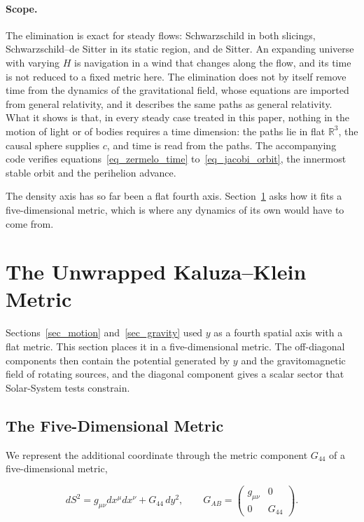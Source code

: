 \documentclass[anonymous]{iopjournal}
\begin{document}
\paragraph{Scope.} The elimination is exact for steady flows: Schwarzschild in both slicings, Schwarzschild--de Sitter in its static region, and de Sitter. An expanding universe with varying $H$ is navigation in a wind that changes along the flow, and its time is not reduced to a fixed metric here. The elimination does not by itself remove time from the dynamics of the gravitational field, whose equations are imported from general relativity, and it describes the same paths as general relativity. What it shows is that, in every steady case treated in this paper, nothing in the motion of light or of bodies requires a time dimension: the paths lie in flat $\mathbb{R}^3$, the causal sphere supplies $c$, and time is read from the paths. The accompanying code verifies equations~\eqref{eq_zermelo_time} to~\eqref{eq_jacobi_orbit}, the innermost stable orbit and the perihelion advance.

The density axis has so far been a flat fourth axis. Section~\ref{sec_kk} asks how it fits a five-dimensional metric, which is where any dynamics of its own would have to come from.

\section{The Unwrapped Kaluza--Klein Metric}\label{sec_kk}

Sections~\ref{sec_motion} and~\ref{sec_gravity} used $y$ as a fourth spatial axis with a flat metric. This section places it in a five-dimensional metric. The off-diagonal components then contain the potential generated by $y$ and the gravitomagnetic field of rotating sources, and the diagonal component gives a scalar sector that Solar-System tests constrain.

\subsection{The Five-Dimensional Metric}

We represent the additional coordinate through the metric component $G_{44}$ of a five-dimensional metric,

\begin{equation}\label{eq_kk_line_element}
    dS^2=g_{\mu\nu}dx^\mu dx^\nu+G_{44}\,dy^2,
    \qquad
    G_{AB}=\begin{pmatrix} g_{\mu\nu} & 0\\ 0 & G_{44}\end{pmatrix}.
\end{equation}
\end{document}
